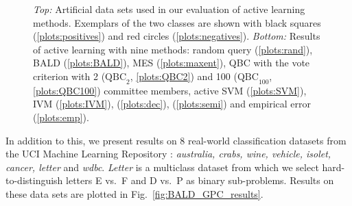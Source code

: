\begin{figure}
	\begin{center}
	\end{center}
	\caption[Evaluation of Bayesian active learning on artificial data sets]{\emph{Top:} Artificial data sets used in our evaluation of active learning methods. Exemplars of the two classes are shown with black squares (\ref{plots:positives}) and red circles (\ref{plots:negatives}). \emph{Bottom:} Results of active learning with nine methods: random query (\ref{plots:rand}), BALD (\ref{plots:BALD}),  MES (\ref{plots:maxent}), QBC with the vote criterion with 2 ($\mbox{QBC}_2$, \ref{plots:QBC2}) and 100 ($\mbox{QBC}_{100}$, \ref{plots:QBC100}) committee members, active SVM (\ref{plots:SVM}), IVM (\ref{plots:IVM}), \citet{Kapoor2007} (\ref{plots:dec}), \citet{Zhu2003} (\ref{plots:semi}) and empirical error (\ref{plots:emp}).}
	\label{fig:artificial}
\end{figure}

In addition to this, we present results on 8 real-world classification datasets from the UCI Machine Learning Repository \citep{UCIRepository}: \emph{australia, crabs, wine, vehicle, isolet, cancer, letter} and \emph{wdbc}. \emph{Letter} is a multiclass dataset from which we select hard-to-distinguish letters E vs.\ F and D vs.\ P as binary sub-problems. Results on these data sets are plotted in Fig.\ \ref{fig:BALD_GPC_results}.

